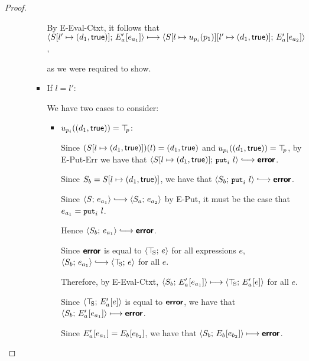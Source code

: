 \begin{proof}
\begin{enumerate}
\begin{enumerate}
\begin{itemize}
        By {\sc E-Eval-Ctxt}, it follows that
        $\langle S[l' \mapsto (d_1, \textsf{true})];\, E'_a\hspace{-0.5mm}\left[e_{a_1}\right] \rangle
        \longmapsto
        \langle S[l \mapsto u_{p_i}(p_1)][l' \mapsto (d_1, \textsf{true})];\, E'_a\hspace{-0.5mm}\left[e_{a_2}\right] \rangle$,
        
        as we were required to show.

      \item If $l = l'$:

        We have two cases to consider:

        \begin{itemize}
        \item $u_{p_i}((d_1, \textsf{true})) = \top\hspace{-0.85mm}_{p}$:


          Since $(S[l \mapsto (d_1, \textsf{true})])(l) =
          (d_1, \textsf{true})$ and
          $u_{p_i}((d_1, \textsf{true})) = \top\hspace{-0.85mm}_{p}$, by {\sc
            E-Put-Err} we have that
          $\config{\extSRaw{S}{l}{\state{d_1}{\frozentrue}}}{\putiexp{l}}
          \parstepsto \error$.

          Since $S_b = S[l \mapsto (d_1, \textsf{true})]$,
          we have that $\config{S_b}{\putiexp{l}} \parstepsto
          \error$.

          Since $\config{S}{e_{a_1}} \parstepsto
          \config{S_a}{e_{a_2}}$ by {\sc E-Put}, it must be the
          case that $e_{a_1} = \mbox{\small{\texttt{put}}}_i~l$.

          Hence $\config{S_b}{e_{a_1}} \parstepsto \error$.

          Since $\textbf{\textsf{error}}$ is equal to $\langle \top\hspace{-0.85mm}_{\mathrm{S}};\, e \rangle$ for all
          expressions $e$, $\config{S_b}{e_{a_1}} \parstepsto
          \config{\topS}{e}$ for all $e$.

          Therefore, by {\sc E-Eval-Ctxt},
          $\langle S_b;\, E'_a\hspace{-0.5mm}\left[e_{a_1}\right] \rangle \longmapsto
          \langle \top\hspace{-0.85mm}_{\mathrm{S}};\, E'_a\hspace{-0.5mm}\left[e\right] \rangle$ for all $e$.

          Since $\langle \top\hspace{-0.85mm}_{\mathrm{S}};\, E'_a\hspace{-0.5mm}\left[e\right] \rangle$ is equal to
          $\textbf{\textsf{error}}$, we have that
          $\langle S_b;\, E'_a\hspace{-0.5mm}\left[e_{a_1}\right] \rangle \longmapsto \textbf{\textsf{error}}$.

          Since $E'_a\hspace{-0.5mm}\left[e_{a_1}\right] =
          E_b\hspace{-0.5mm}\left[e_{b_2}\right]$, we have that
          $\langle S_b;\, E_b\hspace{-0.5mm}\left[e_{b_2}\right] \rangle \longmapsto
          \textbf{\textsf{error}}$.


\end{itemize}
\end{itemize}
\end{enumerate}
\end{enumerate}
\end{proof}
